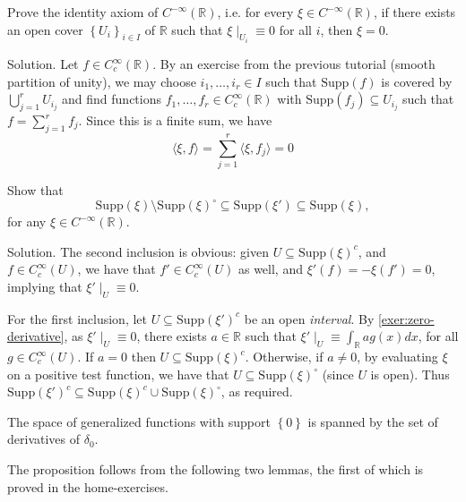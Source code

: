 \documentclass[12pt, draft,reqno,a4paper, twoside]{amsproc}
\newcommand{\supp}{\mathrm{Supp}}
\newcommand{\dbR}{\mathbb R}
\newcommand{\gen}[1]{\langle{#1}\rangle}
\newcommand{\set}[1]{\left\{{#1}\right\}}
\newenvironment{sol}{\sc Solution. \rm}{\hfill \qedsymbol\bigskip}
\begin{document}
\begin{exer}Prove the identity axiom of $C^{-\infty}(\dbR)$, i.e. for every $\xi\in C^{-\infty}(\dbR)$, if there exists an open cover $\set{U_i}_{i\in I}$ of $\dbR$ such that $\xi\mid_{U_i}\equiv 0$ for all $i$, then $\xi=0$.
\end{exer}
\begin{sol}Let $f\in C_c^\infty(\dbR)$. By an exercise from the previous tutorial (smooth partition of unity), we may choose $i_1,\ldots,i_r\in I$ such that $\supp(f)$ is covered by $\bigcup_{j=1}^rU_{i_j}$ and find functions $f_1,\ldots,f_r\in C_c^\infty(\dbR)$ with $\supp(f_{j})\subseteq U_{i_j}$ such that $f=\sum_{j=1}^r f_j$. Since this is a finite sum, we have 
\[\gen{\xi,f}=\sum_{j=1}^r\gen{\xi,f_j}=0\]
\end{sol}

\begin{exer}
Show that \[\supp(\xi)\setminus\supp(\xi)^\circ\subseteq\supp(\xi')\subseteq\supp(\xi),\]
for any $\xi\in C^{-\infty}(\dbR)$. 
\end{exer}
\begin{sol}The second inclusion is obvious: given $U\subseteq \supp(\xi)^c$, and $f\in C_c^\infty(U)$, we have that $f'\in C_c^\infty(U)$ as well, and $\xi'(f)=-\xi(f')=0$, implying that $\xi'\mid_U\equiv 0$. 

For the first inclusion, let $U\subseteq \supp(\xi')^c$ be an open \textit{interval}. By \autoref{exer:zero-derivative}, as $\xi'\mid_U\equiv 0$, there exists $a\in \dbR$ such that $\xi'\mid_U\equiv\int_\dbR ag(x)dx$, for all $g\in C_c^\infty(U)$. If $a=0$ then $U\subseteq \supp(\xi)^c$. Otherwise, if $a\ne 0$, by evaluating $\xi$ on a positive test function, we have that $U\subseteq \supp(\xi)^\circ$ (since $U$ is open). Thus 
$\supp(\xi')^c\subseteq \supp(\xi)^c\cup\supp(\xi)^\circ$, as required.
\end{sol}


\begin{propo}\label{propo:support-zero}The space of generalized functions with support $\set{0}$ is spanned by the set of derivatives of $\delta_0$. 
\end{propo}
The proposition follows from the following two lemmas, the first of which is proved in the home-exercises.
\end{document}
